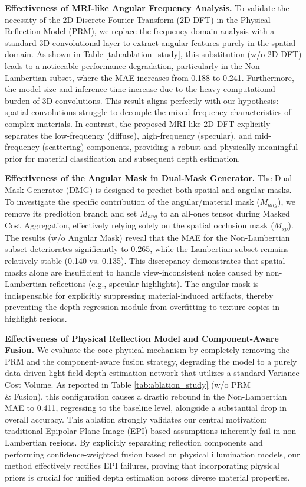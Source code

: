\documentclass[lettersize,journal]{IEEEtran}
\begin{document}
\textbf{Effectiveness of MRI-like Angular Frequency Analysis.} 
To validate the necessity of the 2D Discrete Fourier Transform (2D-DFT) in the Physical Reflection Model (PRM), we replace the frequency-domain analysis with a standard 3D convolutional layer to extract angular features purely in the spatial domain. As shown in Table \ref{tab:ablation_study}, this substitution (w/o 2D-DFT) leads to a noticeable performance degradation, particularly in the Non-Lambertian subset, where the MAE increases from 0.188 to 0.241. Furthermore, the model size and inference time increase due to the heavy computational burden of 3D convolutions. This result aligns perfectly with our hypothesis: spatial convolutions struggle to decouple the mixed frequency characteristics of complex materials. In contrast, the proposed MRI-like 2D-DFT explicitly separates the low-frequency (diffuse), high-frequency (specular), and mid-frequency (scattering) components, providing a robust and physically meaningful prior for material classification and subsequent depth estimation.

\textbf{Effectiveness of the Angular Mask in Dual-Mask Generator.} 
The Dual-Mask Generator (DMG) is designed to predict both spatial and angular masks. To investigate the specific contribution of the angular/material mask ($M_{ang}$), we remove its prediction branch and set $M_{ang}$ to an all-ones tensor during Masked Cost Aggregation, effectively relying solely on the spatial occlusion mask ($M_{sp}$). The results (w/o Angular Mask) reveal that the MAE for the Non-Lambertian subset deteriorates significantly to 0.265, while the Lambertian subset remains relatively stable (0.140 vs. 0.135). This discrepancy demonstrates that spatial masks alone are insufficient to handle view-inconsistent noise caused by non-Lambertian reflections (e.g., specular highlights). The angular mask is indispensable for explicitly suppressing material-induced artifacts, thereby preventing the depth regression module from overfitting to texture copies in highlight regions.

\textbf{Effectiveness of Physical Reflection Model and Component-Aware Fusion.} 
We evaluate the core physical mechanism by completely removing the PRM and the component-aware fusion strategy, degrading the model to a purely data-driven light field depth estimation network that utilizes a standard Variance Cost Volume. As reported in Table \ref{tab:ablation_study} (w/o PRM \\& Fusion), this configuration causes a drastic rebound in the Non-Lambertian MAE to 0.411, regressing to the baseline level, alongside a substantial drop in overall accuracy. This ablation strongly validates our central motivation: traditional Epipolar Plane Image (EPI) based assumptions inherently fail in non-Lambertian regions. By explicitly separating reflection components and performing confidence-weighted fusion based on physical illumination models, our method effectively rectifies EPI failures, proving that incorporating physical priors is crucial for unified depth estimation across diverse material properties.
\end{document}
